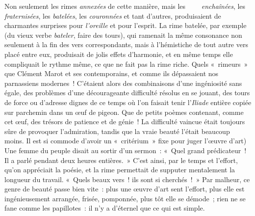 \documentclass[french,twoside]{book} %
\begin{document}
\noindent Non seulement les rimes \emph{annexées} de cette manière, mais les     \emph{enchaînées}, les \emph{fraternisées}, les \emph{batelées}, les \emph{couronnées} et tant d’autres, produisaient de charmantes surprises pour \emph{l’oreille} et pour l’esprit. La rime batelée, par exemple (du vieux verbe \emph{bateler}, faire des tours), qui ramenait la même consonance non seulement à la fin des vers  correspondants, mais à l’hémistiche de tout autre vers placé entre eux, produisait de jolis effets d’harmonie, et en même temps elle compliquait le rythme même, ce que ne fait pas la rime riche. Quels « rimeurs » que Clément Marot et ses contemporains, et comme ils dépassaient nos parnassiens modernes ! C’étaient alors des combinaisons d’une ingéniosité sans égale, des problèmes d’une décourageante difficulté résolus en se jouant, des tours de force ou d’adresse dignes de ce temps où l’on faisait tenir l’\emph{Iliade} entière copiée sur parchemin dans un œuf de pigeon. Que de petits poèmes contenant, comme cet œuf, des trésors de patience et de génie ! La difficulté vaincue était toujours sûre de provoquer l’admiration, tandis que la vraie beauté l’était beaucoup moins. Il est si commode d’avoir un « critérium » fixe pour juger l’œuvre d’art) Une femme du peuple disait au sortir d’un sermon : « Quel grand prédicateur ! Il a parlé pendant deux heures entières. » C’est ainsi, par le temps et l’effort, qu’on appréciait la poésie, et la rime permettait de supputer mentalement la longueur du travail. « Quels beaux vers ! ils sont si cherchés ! » Par malheur, ce genre de beauté passe bien vite : plus une œuvre d’art sent l’effort, plus elle est ingénieusement arrangée, frisée, pomponnée, plus tôt elle se démode ; rien ne se fane comme les papillotes : il n’y a d’éternel que ce qui est simple.\par
\end{document}
